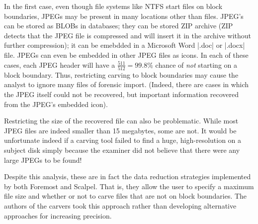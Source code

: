 \documentclass[11pt,letter]{article}
\begin{document}
In the first case, even though file systems like NTFS start
files on block boundaries, JPEGs may be present in many locations
other than files. JPEG's can be stored as BLOBs in databases; they can
be stored ZIP archive (ZIP detects that the JPEG file is compressed
and will insert it in the archive without further compression); it can
be emebdded in a Microsoft Word |.doc| or |.docx| file. JPEGs can even
be embedded in other JPEG files as icons. In each of these cases, each
JPEG header will have a $\frac{511}{512}=99.8\%$ chance of \emph{not}
starting on a block boundary. Thus, restricting carving to block
boundaries may cause the analyst to ignore many files of forensic
import. (Indeed, there are cases in which the JPEG itself could not be
recovered, but important information recovered from the JPEG's 
embedded icon).

Restricting the size of the recovered file can also be
problematic. While most JPEG files are indeed smaller than 15
megabytes, some are not. It would be unfortunate indeed if a carving
tool failed to find a huge, high-resolution on a subject disk simply
because the examiner did not believe that there were any large JPEGs
to be found!



Despite this analysis, these are in fact the data reduction strategies
implemented by both Foremost and Scalpel. That is, they allow the user
to specify a maximum file size and whether or not to carve files that
are not on block boundaries. The authors of the carvers took this
approach rather than developing alternative approaches for increasing
precision. 
\end{document}
